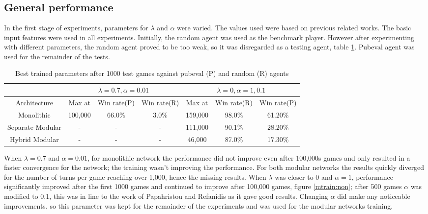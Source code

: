 \documentclass[12pt,a4paper]{article}
\begin{document}
\subsection{General performance}
In the first stage of experiments, parameters for $\lambda$ and $\alpha$ were varied. The values used were based on previous related works. The basic input features were used in all experiments. Initially, the random agent was used as the benchmark player. However after experimenting with different parameters, the random agent proved to be too weak, so it was disregarded as a testing agent, table \ref{rp}. Pubeval agent was used for the remainder of the tests.
\begin{table}[htb]
    \centering
    \caption{Best trained parameters after 1000 test games against pubeval (P) and random (R) agents}
    \label{rp}
    \begin{tabular}{c|ccc|ccc}
        & \multicolumn{3}{c}{$\lambda=0.7, \alpha=0.01$} & \multicolumn{3}{|c}{$\lambda=0, \alpha=1, 0.1$} \\
        \hline
        \hline
        Architecture & Max at & Win rate(P) & Win rate(R) & Max at & Win rate(R) & Win rate(P)  \\ 
        \hline
        Monolithic & 100,000 & 66.0\% & 3.0\% & 159,000 & 98.0\% & 61.20\% \\ 
        \hline
        Separate Modular & - & - & - & 111,000 & 90.1\% & 28.20\% \\ 
        \hline
        Hybrid Modular & - & - & - & 46,000 & 87.0\% & 17.30\% \\ 
        \hline
    \end{tabular}
\end{table}

When $\lambda=0.7$ and $\alpha=0.01$, for monolithic network the performance did not improve even after 100,000s games and only resulted in a faster convergence for the network; the training wasn't improving the performance. For both modular networks the results quickly diverged for the number of turns per game reaching over 1,000, hence the missing results. When $\lambda$ was closer to 0 and $\alpha=1$, performance significantly improved after the first 1000 games and continued to improve after 100,000 games, figure \ref{mtrain:non}; after 500 games $\alpha$ was modified to 0.1, this was in line to the work of Papahristou and Refanidis \citeyear{DBLP:conf/ifip12/PapahristouR12} as it gave good results. Changing $\alpha$ did make any noticeable improvements. so this parameter was kept for the remainder of the experiments and was used for the modular networks training.
\end{document}
